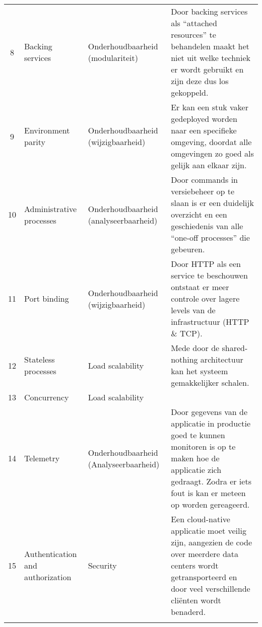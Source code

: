 \begin{longtable}[c]{c p{3cm} p{3.5cm} p{5.5cm}}
	8 & Backing services & Onderhoudbaarheid (modulariteit) & Door backing services als \enquote{attached resources} te behandelen maakt het niet uit welke techniek er wordt gebruikt en zijn deze dus los gekoppeld. \\
	9 & Environment parity & Onderhoudbaarheid (wijzigbaarheid) & Er kan een stuk vaker gedeployed worden naar een specifieke omgeving, doordat alle omgevingen zo goed als gelijk aan elkaar zijn. \\
	10 & Administrative processes & Onderhoudbaarheid (analyseerbaarheid) & Door commands in versiebeheer op te slaan is er een duidelijk overzicht en een geschiedenis van alle \enquote{one-off processes} die gebeuren. \\
	11 & Port binding & Onderhoudbaarheid (wijzigbaarheid) & Door HTTP als een service te beschouwen ontstaat er meer controle over lagere levels van de infrastructuur (HTTP \& TCP). \\
	12 & Stateless processes & Load scalability & Mede door de shared-nothing architectuur kan het systeem gemakkelijker schalen. \\
	13 & Concurrency & Load scalability &  \\
	14 & Telemetry & Onderhoudbaarheid (Analyseerbaarheid) & Door gegevens van de applicatie in productie goed te kunnen monitoren is op te maken hoe de applicatie zich gedraagt. Zodra er iets fout is kan er meteen op worden gereageerd. \\
	15 & Authentication and authorization & Security & Een cloud-native applicatie moet veilig zijn, aangezien de code over meerdere data centers wordt getransporteerd en door veel verschillende cliënten wordt benaderd. \\
	\bottomrule\\
\end{longtable}

\label{Bijlagek6}